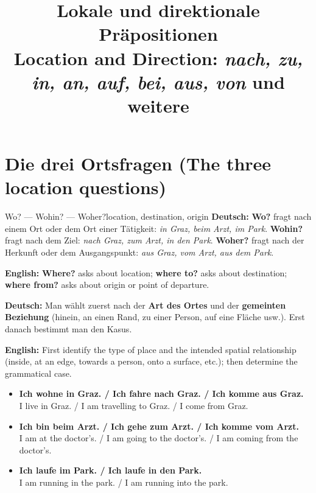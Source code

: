 \documentclass[a4paper,11pt]{article}
\title{Lokale und direktionale Präpositionen\\
\large Location and Direction: \emph{nach, zu, in, an, auf, bei, aus, von} und weitere}
\date{}
\newcommand{\GermanText}[1]{\textbf{Deutsch: }#1\par}
\newcommand{\EnglishText}[1]{{\small\color{SoftGray}\textbf{English: }#1\par}}
\newcommand{\ExampleItem}[2]{\item \textbf{#1}\\{\small\color{SoftGray}#2}}
\begin{document}
\maketitle
\setcounter{tocdepth}{1}
\tableofcontents
\newpage

\section{Die drei Ortsfragen (The three location questions)}
\begin{grammarentry}{Wo? --- Wohin? --- Woher?}{location, destination, origin}
\GermanText{\textbf{Wo?} fragt nach einem Ort oder dem Ort einer Tätigkeit: \emph{in Graz, beim Arzt, im Park}. \textbf{Wohin?} fragt nach dem Ziel: \emph{nach Graz, zum Arzt, in den Park}. \textbf{Woher?} fragt nach der Herkunft oder dem Ausgangspunkt: \emph{aus Graz, vom Arzt, aus dem Park}.}
\EnglishText{\textbf{Where?} asks about location; \textbf{where to?} asks about destination; \textbf{where from?} asks about origin or point of departure.}
\GermanText{Man wählt zuerst nach der \textbf{Art des Ortes} und der \textbf{gemeinten Beziehung} (hinein, an einen Rand, zu einer Person, auf eine Fläche usw.). Erst danach bestimmt man den Kasus.}
\EnglishText{First identify the type of place and the intended spatial relationship (inside, at an edge, towards a person, onto a surface, etc.); then determine the grammatical case.}
\end{grammarentry}
\begin{exbox}\begin{itemize}
\ExampleItem{Ich wohne in Graz. / Ich fahre nach Graz. / Ich komme aus Graz.}{I live in Graz. / I am travelling to Graz. / I come from Graz.}
\ExampleItem{Ich bin beim Arzt. / Ich gehe zum Arzt. / Ich komme vom Arzt.}{I am at the doctor's. / I am going to the doctor's. / I am coming from the doctor's.}
\ExampleItem{Ich laufe im Park. / Ich laufe in den Park.}{I am running in the park. / I am running into the park.}
\end{itemize}\end{exbox}
\end{document}
